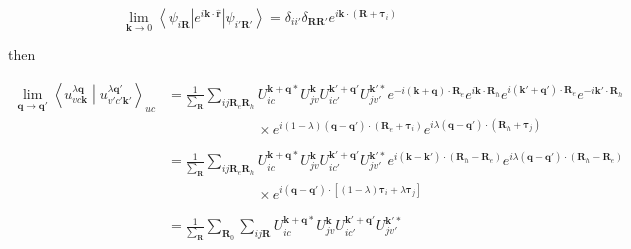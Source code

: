 \begin{equation}
  \lim_{\boldsymbol{k} \rightarrow 0} \left\langle \psi_{i\boldsymbol{R}}^{} \right| 
      e^{i\boldsymbol{k} \cdot \hat{\boldsymbol{r}}} 
    \left| \psi_{i'\boldsymbol{R}'}^{} \right\rangle 
  = \delta_{ii'} \delta_{\boldsymbol{R}\boldsymbol{R}'} e^{i\boldsymbol{k} \cdot (\boldsymbol{R} + \boldsymbol{\tau}_i)} 
\end{equation}

\noindent
then

\begin{equation}
  \begin{aligned}
    \lim_{\boldsymbol{q} \rightarrow \boldsymbol{q}'} 
    \left\langle u_{v c \boldsymbol{k}}^{\lambda\boldsymbol{q}} \middle| 
    u_{v' c' \boldsymbol{k}'}^{\lambda\boldsymbol{q}'} \right\rangle_{uc} 
    &= \frac{1}{\sum_{\boldsymbol{R}}} \sum_{ij\boldsymbol{R}_e\boldsymbol{R}_h}
      U_{ic}^{\boldsymbol{k}+\boldsymbol{q}*} U_{jv}^{\boldsymbol{k}} 
      U_{ic'}^{\boldsymbol{k}'+\boldsymbol{q}'} U_{jv'}^{\boldsymbol{k}'*} 
      e^{-i(\boldsymbol{k}+\boldsymbol{q}) \cdot \boldsymbol{R}_e} 
      e^{i\boldsymbol{k} \cdot \boldsymbol{R}_h}
      e^{i(\boldsymbol{k}'+\boldsymbol{q}') \cdot \boldsymbol{R}_e}
      e^{-i\boldsymbol{k}' \cdot \boldsymbol{R}_h}\\
    &\phantom{=\frac{1}{\sum_{R}} \sum_{ij\boldsymbol{R}_e\boldsymbol{R}_h}} 
      \times e^{i(1-\lambda)(\boldsymbol{q} - \boldsymbol{q}') \cdot (\boldsymbol{R}_e + \boldsymbol{\tau}_i)} 
        e^{i\lambda(\boldsymbol{q} - \boldsymbol{q}') \cdot (\boldsymbol{R}_h + \boldsymbol{\tau}_j)} \\
    &= \frac{1}{\sum_{\boldsymbol{R}}} \sum_{ij\boldsymbol{R}_e\boldsymbol{R}_h}
      U_{ic}^{\boldsymbol{k}+\boldsymbol{q}*} U_{jv}^{\boldsymbol{k}} 
      U_{ic'}^{\boldsymbol{k}'+\boldsymbol{q}'} U_{jv'}^{\boldsymbol{k}'*} 
      e^{i(\boldsymbol{k} - \boldsymbol{k}') \cdot (\boldsymbol{R}_h - \boldsymbol{R}_e)}
      e^{i\lambda(\boldsymbol{q} - \boldsymbol{q}') \cdot (\boldsymbol{R}_h - \boldsymbol{R}_e)} \\
    &\phantom{=\frac{1}{\sum_{R}} \sum_{ij\boldsymbol{R}_e\boldsymbol{R}_h}} 
      \times e^{i(\boldsymbol{q} - \boldsymbol{q}') \cdot [(1-\lambda)\boldsymbol{\tau}_i + \lambda\boldsymbol{\tau}_j]} \\
    &= \frac{1}{\sum_{\boldsymbol{R}}} \sum_{\boldsymbol{R}_0}\sum_{ij\boldsymbol{R}}
      U_{ic}^{\boldsymbol{k}+\boldsymbol{q}*} U_{jv}^{\boldsymbol{k}} 
      U_{ic'}^{\boldsymbol{k}'+\boldsymbol{q}'} U_{jv'}^{\boldsymbol{k}'*} 

\end{aligned}
\end{equation}
